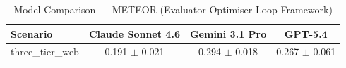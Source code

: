\begin{table}[htbp]
\centering
\caption{Model Comparison — METEOR (Evaluator Optimiser Loop Framework)}
\label{tab:model_meteor}
\begin{tabular}{lccc}
\toprule
Scenario & Claude Sonnet 4.6 & Gemini 3.1 Pro & GPT-5.4 \\
\midrule
three\_tier\_web & 0.191 $\pm$ 0.021 & 0.294 $\pm$ 0.018 & 0.267 $\pm$ 0.061 \\
\bottomrule
\end{tabular}
\end{table}